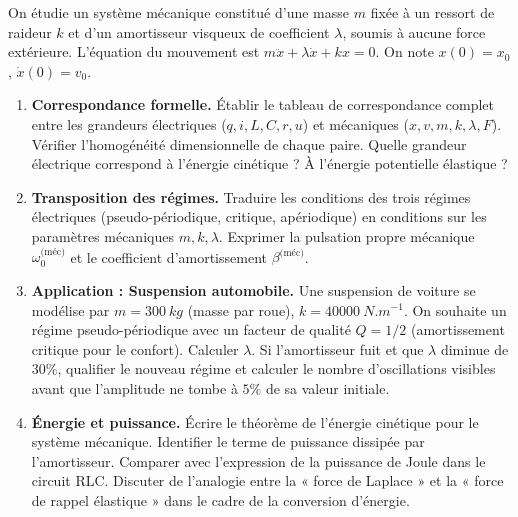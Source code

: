 \documentclass[11pt]{article}
\begin{document}
\begin{exercice}
On étudie un système mécanique constitué d'une masse $m$ fixée à un ressort de raideur $k$ et d'un amortisseur visqueux de coefficient $\lambda$, soumis à aucune force extérieure. L'équation du mouvement est $m\ddot{x} + \lambda \dot{x} + k x = 0$. On note $x(0)=x_0$, $\dot{x}(0)=v_0$.

\begin{enumerate}
    \item \textbf{Correspondance formelle.} Établir le tableau de correspondance complet entre les grandeurs électriques ($q, i, L, C, r, u$) et mécaniques ($x, v, m, k, \lambda, F$). Vérifier l'homogénéité dimensionnelle de chaque paire. Quelle grandeur électrique correspond à l'énergie cinétique ? À l'énergie potentielle élastique ?
    \item \textbf{Transposition des régimes.} Traduire les conditions des trois régimes électriques (pseudo-périodique, critique, apériodique) en conditions sur les paramètres mécaniques $m, k, \lambda$. Exprimer la pulsation propre mécanique $\omega_0^{\text{(méc)}}$ et le coefficient d'amortissement $\beta^{\text{(méc)}}$.
    \item \textbf{Application : Suspension automobile.} Une suspension de voiture se modélise par $m = \SI{300}{kg}$ (masse par roue), $k = \SI{40000}{N.m^{-1}}$. On souhaite un régime pseudo-périodique avec un facteur de qualité $Q = 1/2$ (amortissement critique pour le confort). Calculer $\lambda$. Si l'amortisseur fuit et que $\lambda$ diminue de $30\%$, qualifier le nouveau régime et calculer le nombre d'oscillations visibles avant que l'amplitude ne tombe à $5\%$ de sa valeur initiale.
    \item \textbf{Énergie et puissance.} Écrire le théorème de l'énergie cinétique pour le système mécanique. Identifier le terme de puissance dissipée par l'amortisseur. Comparer avec l'expression de la puissance de Joule dans le circuit RLC. Discuter de l'analogie entre la « force de Laplace » et la « force de rappel élastique » dans le cadre de la conversion d'énergie.
\end{enumerate}
\end{exercice}
\end{document}
